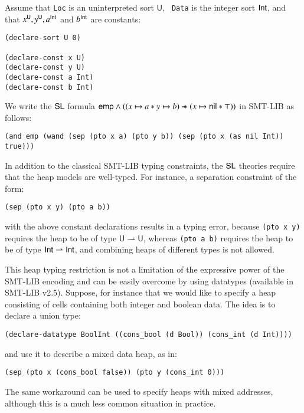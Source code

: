 \documentclass{llncs}
\begin{document}
Assume that {\tt Loc} is an uninterpreted sort $\mathsf{U}$, {\tt
  Data} is the integer sort $\mathsf{Int}$, and that $x^{\mathsf{U}}, y^{\mathsf{U}},
a^{\mathsf{Int}}$ and $b^{\mathsf{Int}}$ are constants: 
\begin{verbatim}
(declare-sort U 0)

(declare-const x U)
(declare-const y U)
(declare-const a Int)
(declare-const b Int)
\end{verbatim}
We write the $\mathsf{SL}$ formula \(\mathsf{emp} \wedge ((x \mapsto a * y \mapsto
b) \mathrel{\mbox{$\hspace*{-0.03em}\mathord{-}\hspace*{-0.66em} \mathord{-}\hspace*{-0.36em}\mathord{*}$\hspace*{-0.005em}}} (x \mapsto \mathsf{nil} * \top))\) in SMT-LIB as follows:
\begin{verbatim}
(and emp (wand (sep (pto x a) (pto y b)) (sep (pto x (as nil Int)) true)))
\end{verbatim}
In addition to the classical SMT-LIB typing constraints, the $\mathsf{SL}$
theories require that the heap models are well-typed. For instance, a
separation constraint of the form: 
\begin{verbatim}
(sep (pto x y) (pto a b))
\end{verbatim}
with the above constant declarations results in a typing error,
because {\tt (pto x y)} requires the heap to be of type $\mathsf{U}
\rightharpoonup \mathsf{U}$, whereas {\tt (pto a b)} requires the heap
to be of type $\mathsf{Int} \rightharpoonup \mathsf{Int}$, and combining heaps of
different types is not allowed. 


This heap typing restriction is not a limitation of the expressive
power of the SMT-LIB encoding and can be easily overcome by using
datatypes (available in SMT-LIB v2.5). Suppose, for instance that we
would like to specify a heap consisting of cells containing both
integer and boolean data. The idea is to declare a union type: 
\begin{verbatim}
(declare-datatype BoolInt ((cons_bool (d Bool)) (cons_int (d Int))))
\end{verbatim}
and use it to describe a mixed data heap, as in: 
\begin{verbatim}
(sep (pto x (cons_bool false)) (pto y (cons_int 0)))
\end{verbatim}
The same workaround can be used to specify heaps with mixed addresses,
although this is a much less common situation in practice. 
\end{document}
